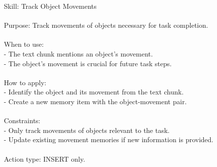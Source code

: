 \begin{center}
\begin{tcolorbox}[
  title={Evolved Skill on ALFWorld - TRACK\_OBJECT\_MOVEMENTS},
  colback=orange!6,
  colframe=orange!75!black,
  coltitle=black
]
{
Skill: Track Object Movements \\\\
Purpose: Track movements of objects necessary for task completion. \\\\
When to use: \\
- The text chunk mentions an object's movement. \\
- The object's movement is crucial for future task steps. \\\\
How to apply: \\
- Identify the object and its movement from the text chunk. \\
- Create a new memory item with the object-movement pair. \\\\
Constraints: \\
- Only track movements of objects relevant to the task. \\
- Update existing movement memories if new information is provided. \\\\
Action type: INSERT only.
}
\label{appendix:case_track_object_movements}
\end{tcolorbox}
\end{center}

